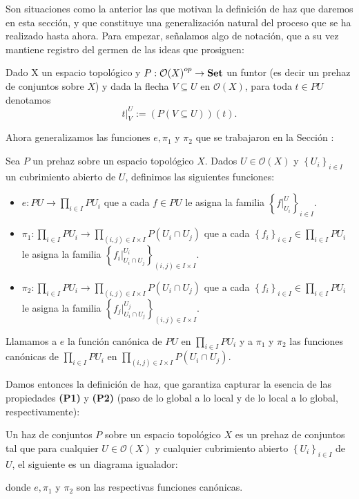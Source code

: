 Son situaciones como la anterior las que motivan la definición de haz que daremos en esta sección, y que constituye una generalización natural del proceso que se ha realizado hasta ahora. Para empezar, señalamos algo de notación, que a su vez mantiene registro del germen de las ideas que prosiguen:
\begin{Not}
   Dado X un espacio topológico y ${P:\mathcal{O}(X)}^{op}\to\normalfont{\textbf{Set}}$ un funtor (es decir un prehaz de conjuntos sobre $X$) y dada la flecha $V\subseteq U$ en $\mathcal{O}(X)$, para toda $t\in PU$ denotamos 
   $$
   t|^{U}_{V}:=(P(V\subseteq U))(t).
   $$
\end{Not}
Ahora generalizamos las funciones $e,\pi_1$ y $\pi_2$ que se trabajaron en la Sección :
\begin{Def}
   Sea $P$ un prehaz sobre un espacio topológico $X$. Dados $U\in\mathcal{O}(X)$ y $\left\lbrace U_i\right\rbrace_{i\in I}$ un cubrimiento abierto de $U$, definimos las siguientes funciones:
   \begin{itemize}
      \item $e:PU\to \prod_{i\in I}PU_i$ que a cada $f\in PU$ le asigna la familia $\left\lbrace f|^{U}_{U_i}\right\rbrace_{i\in I}$.
      \item $\pi_1:\prod_{i\in I}PU_i\to \prod_{(i,j)\in I\times I}P(U_i\cap U_j)$ que a cada $\left\lbrace f_i\right\rbrace_{i\in I}\in\prod_{i\in I}PU_i$ le asigna la familia $\left\lbrace {f_i}|^{U_i}_{U_i\cap U_j}\right\rbrace_{(i,j)\in I\times I}$.
      \item $\pi_2:\prod_{i\in I}PU_i\to \prod_{(i,j)\in I\times I}P(U_i\cap U_j)$ que a cada $\left\lbrace f_i\right\rbrace_{i\in I}\in\prod_{i\in I}PU_i$ le asigna la familia $\left\lbrace {f_j}|^{U_j}_{U_i\cap U_j}\right\rbrace_{(i,j)\in I\times I}$.
   \end{itemize}
   Llamamos a $e$ la función canónica de $PU$ en $\prod_{i\in I}PU_i$ y a $\pi_1$ y $\pi_2$ las funciones canónicas de $\prod_{i\in I}PU_i$ en $\prod_{(i,j)\in I\times I}P(U_i\cap U_j)$.
\end{Def}
Damos entonces la definición de haz, que garantiza capturar la esencia de las propiedades \textbf{(P1)} y \textbf{(P2)} (paso de lo global a lo local y de lo local a lo global, respectivamente):
\begin{Def}
   Un haz de conjuntos $P$ sobre un espacio topológico $X$ es un prehaz de conjuntos tal que para cualquier $U\in \mathcal{O}(X)$ y cualquier cubrimiento abierto $\left\lbrace U_i\right\rbrace_{i\in I}$ de $U$, el siguiente es un diagrama igualador:
   
   donde $e,\pi_1$ y $\pi_2$ son las respectivas funciones canónicas.
\end{Def}
